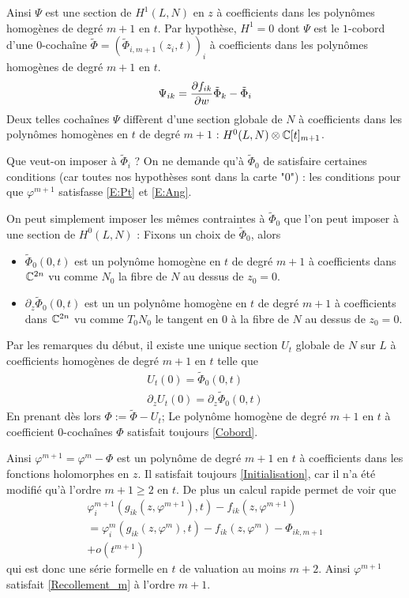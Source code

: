 \documentclass[a4paper,10pt,draft,makeidx,twocolumn]{amsart}
\begin{document}
Ainsi $\Psi$ est une section de $H^1(L,N)$ en $z$ à coefficients dans les polynômes homogènes de degré $m+1$ en $t$. Par hypothèse, $H^1 = 0$ dont $\Psi$ est le $1$-cobord  d'une $0$-cochaîne $\tilde{\Phi} = (\tilde{\Phi}_{i,m+1}(z_i,t))_i$ à coefficients dans les polynômes homogènes de degré $m+1$ en $t$.
\begin{equation}\label{Cobord}
\Psi_{ik} = \dfrac{\partial{f_{ik}}}{\partial{w}}\tilde{\Phi}_k - \tilde\Phi_i
\end{equation}
Deux telles cochaînes $\Psi$ diffèrent d'une section globale de $N$ à coefficients dans les polynômes homogènes en $t$ de degré $m+1$ : $H^0(L,N) \otimes \mathbb{C}[t]_{m+1}$.

Que veut-on imposer à $\tilde\Phi_i$ ?
On ne demande qu'à $\tilde\Phi_0$ de satisfaire certaines conditions (car toutes nos hypothèses sont dans la carte "$0$") : les conditions pour que $\varphi^{m+1}$ satisfasse \eqref{E:Pt} et \eqref{E:Ang}.

On peut simplement imposer les mêmes contraintes à $\tilde\Phi_0$ que l'on peut imposer à une section de $H^0(L,N)$ : Fixons un choix de $\tilde\Phi_0$, alors
\begin{itemize}
 \item $\tilde\Phi_0(0,t)$ est un polynôme homogène en $t$ de degré $m+1$ à coefficients dans $\mathbb{C}^{2n}$ vu comme $N_0$ la fibre de $N$ au dessus de $z_0=0$.
\item $\partial_z \tilde\Phi_0(0,t)$ est un un polynôme homogène en $t$ de degré $m+1$ à coefficients dans $\mathbb{C}^{2n}$ vu comme $T_0N_0$ le tangent en $0$ à la fibre de $N$ au dessus de $z_0=0$.
 \end{itemize}
Par les remarques du début, il existe une unique section $U_t$ globale de $N$ sur $L$ à coefficients homogènes de degré $m+1$ en $t$ telle que
\begin{subequations}
\begin{gather}
	U_t(0) = \tilde\Phi_0(0,t)\\
	\partial_z U_t (0) = \partial_z \tilde\Phi_0(0,t)
\end{gather}
\end{subequations}
En prenant dès lors $\Phi := \tilde\Phi - U_t$; Le polynôme homogène de degré $m+1$ en $t$ à coefficient $0$-cochaînes $\Phi$ satisfait toujours \eqref{Cobord}.

Ainsi $\varphi^{m+1} = \varphi^m - \Phi$ est un polynôme de degré $m+1$ en $t$ à coefficients dans les fonctions holomorphes en $z$. Il satisfait toujours \eqref{Initialisation}, car il n'a été modifié qu'à l'ordre $m+1 \geq 2$ en $t$.
De plus un calcul rapide permet de voir que
\begin{multline}
\varphi^{m+1}_i(g_{ik}(z,\varphi^{m+1}),t) - f_{ik}(z, \varphi^{m+1}) \\= 
\varphi^{m}_i(g_{ik}(z,\varphi^{m}),t) - f_{ik}(z, \varphi^{m}) - \Phi_{ik,m+1}\\
+o(t^{m+1})
\end{multline}
qui est donc une série formelle en $t$ de valuation au moins $m+2$. Ainsi $\varphi^{m+1}$ satisfait \eqref{Recollement_m} à l'ordre $m+1$.
\end{document}
